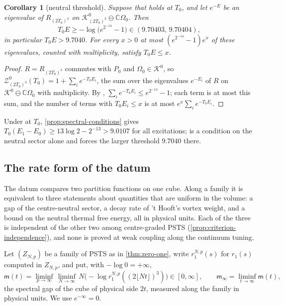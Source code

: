 \documentclass[11pt,a4paper]{amsart}
\newtheorem{corollary}[theorem]{Corollary}
\theoremstyle{definition}
\theoremstyle{remark}
\numberwithin{equation}{section}
\newcommand{\C}{\mathbb{C}}          %
\newcommand{\Kspace}{\mathcal{K}}    %
\newcommand{\PSTS}{\textup{PSTS}}          %
\newcommand{\TT}{\mathbb{T}}               %
\newcommand{\Zc}{\mathcal{Z}}              %
\newcommand{\cube}[1]{(2#1)^3}             %
\newcommand{\Omegazero}{\Omega_0}          %
\newcommand{\Bcirc}{\text{\upshape(B$^{\circ}$)}}   %
\newcommand{\hypN}{\text{\upshape(N)}}              %
\begin{document}
\begin{corollary}[neutral threshold]\label{cor:neutral-threshold}
Suppose that \hypN{} holds at $T_0$, and let $e^{-E}$ be an eigenvalue of $R_{\cube{T_0}}$ on $\Kspace^0_{\cube{T_0}}\ominus\C\Omegazero$. Then
\[
T_0E\ge-\log\bigl(e^{2^{-14}}-1\bigr)\in(9.70403,\,9.70404),
\]
in particular $T_0E>9.7040$. For every $x>0$ at most $(e^{2^{-14}}-1)e^x$ of these eigenvalues, counted with multiplicity, satisfy $T_0E\le x$.
\end{corollary}

\begin{proof}
$R=R_{\cube{T_0}}$ commutes with $P_0$ and $\Omegazero\in\Kspace^0$, so $\Zc^0_{\cube{T_0}}(T_0)=1+\sum_ie^{-T_0E_i}$, the sum over the eigenvalues $e^{-E_i}$ of $R$ on $\Kspace^0\ominus\C\Omegazero$ with multiplicity. By \hypN, $\sum_ie^{-T_0E_i}\le e^{2^{-14}}-1$; each term is at most this sum, and the number of terms with $T_0E_i\le x$ is at most $e^x\sum_ie^{-T_0E_i}$.
\end{proof}

Under \Bcirc{} at $T_0$, \cref{prop:spectral-conditions} gives $T_0(E_1-E_0)\ge13\log2-2^{-13}>9.0107$ for all excitations; \hypN{} is a condition on the neutral sector alone and forces the larger threshold $9.7040$ there.

\subsection{The rate form of the datum}

The datum compares two partition functions on one cube. Along a family it is equivalent to three statements about quantities that are uniform in the volume: a gap of the centre-neutral sector, a decay rate of 't Hooft's vortex weight, and a bound on the neutral thermal free energy, all in physical units. Each of the three is independent of the other two among centre-graded \PSTS{} (\cref{prop:criterion-independence}), and none is proved at weak coupling along the continuum tuning.

Let $(Z_{N,p})$ be a family of \PSTS{} as in \cref{thm:zero-one}, write $r_1^{N,p}(s)$ for $r_1(s)$ computed in $Z_{N,p}$, and put, with $-\log0=+\infty$,
\[
\mathsf m(t)=\liminf_{p\to\infty}\,\liminf_{N\to\infty}\,N\bigl(-\log r_1^{N,p}(\cube{\lfloor Nt\rfloor})\bigr)\in[0,\infty],\qquad \mathsf m_\infty=\liminf_{t\to\infty}\mathsf m(t),
\]
the spectral gap of the cube of physical side $2t$, measured along the family in physical units. We use $e^{-\infty}=0$.
\end{document}
